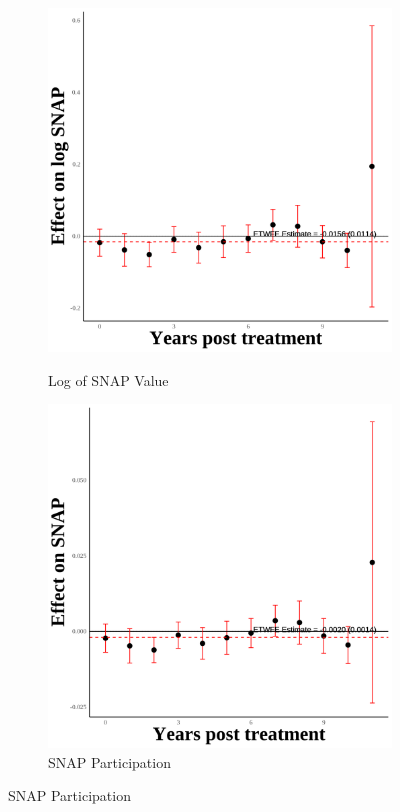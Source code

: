 \documentclass[12pt,english]{article}
\begin{document}
\begin{figure}[H]
  \vspace{0.3cm} %

  \begin{subfigure}[b]{0.3\textwidth}
    \centering
    \caption{Log of SNAP Value}
    \includegraphics[width=\linewidth]{figures/plot29-ln_snap_event_study-secgen-hh.png}
    \label{fig:ln-snap-secgen-hh}
  \end{subfigure}
  \hfill
  \begin{subfigure}[b]{0.3\textwidth}
    \centering
    \caption{SNAP Participation}
    \includegraphics[width=\linewidth]{figures/plot30-snap_event_study-secgen-hh.png}

\end{subfigure}
\end{figure}
\end{document}
